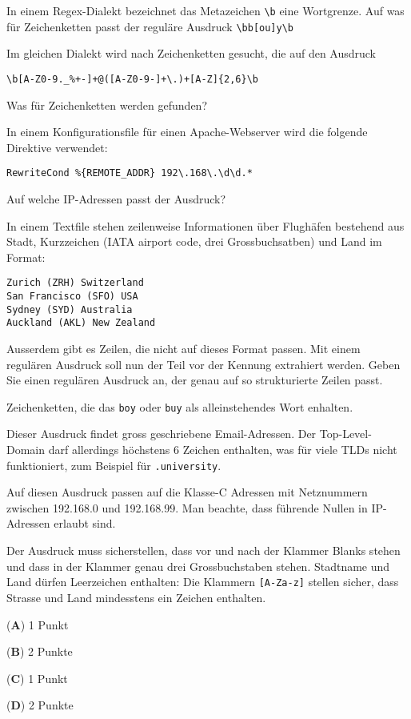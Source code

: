 \begin{teilaufgaben}
\item
In einem Regex-Dialekt bezeichnet das Metazeichen \texttt{\textbackslash{}b}
eine Wortgrenze.
Auf was für Zeichenketten passt der reguläre Ausdruck
\texttt{\textbackslash{}bb[ou]y\textbackslash{}b}
\item
Im gleichen Dialekt wird nach Zeichenketten gesucht, die auf den Ausdruck
\begin{verbatim}
\b[A-Z0-9._%+-]+@([A-Z0-9-]+\.)+[A-Z]{2,6}\b
\end{verbatim}
Was für Zeichenketten werden gefunden?
\item
In einem Konfigurationsfile für einen Apache-Webserver wird die folgende
Direktive verwendet:
\begin{verbatim}
RewriteCond %{REMOTE_ADDR} 192\.168\.\d\d.*
\end{verbatim}
Auf welche IP-Adressen passt der Ausdruck?
\item
In einem Textfile stehen zeilenweise Informationen über Flughäfen bestehend
aus Stadt, Kurzzeichen (IATA airport code, drei Grossbuchsatben) und Land
im Format:
\begin{verbatim}
Zurich (ZRH) Switzerland
San Francisco (SFO) USA
Sydney (SYD) Australia
Auckland (AKL) New Zealand
\end{verbatim}
Ausserdem gibt es Zeilen, die nicht auf dieses Format passen.
Mit einem regulären Ausdruck soll nun der Teil vor der Kennung extrahiert
werden. 
Geben Sie einen regulären Ausdruck an, der genau auf so strukturierte
Zeilen passt.
\end{teilaufgaben}

\begin{loesung}
\begin{teilaufgaben}
\item
Zeichenketten, die das \texttt{boy} oder \texttt{buy} als
alleinstehendes Wort enhalten.
\item
Dieser Ausdruck findet gross geschriebene Email-Adressen.
Der Top-Level-Domain darf allerdings höchstens 6 Zeichen enthalten,
was für viele TLDs nicht funktioniert, zum Beispiel für \texttt{.university}.
\item
Auf diesen Ausdruck passen auf die Klasse-C Adressen mit Netznummern
zwischen 192.168.0 und 192.168.99.
Man beachte, dass führende Nullen in IP-Adressen erlaubt sind.
\item
Der Ausdruck muss sicherstellen, dass vor und nach der Klammer Blanks stehen
und dass in der Klammer genau drei Grossbuchstaben stehen.
Stadtname und Land dürfen Leerzeichen enthalten:
Die Klammern \texttt{[A-Za-z]} stellen sicher, dass Strasse und Land
mindesstens ein Zeichen enthalten.
\end{teilaufgaben}
\end{loesung}

\begin{bewertung}
\begin{teilaufgaben}
\item ({\bf A}) 1 Punkt
\item ({\bf B}) 2 Punkte
\item ({\bf C}) 1 Punkt
\item ({\bf D}) 2 Punkte
\end{teilaufgaben}
\end{bewertung}


